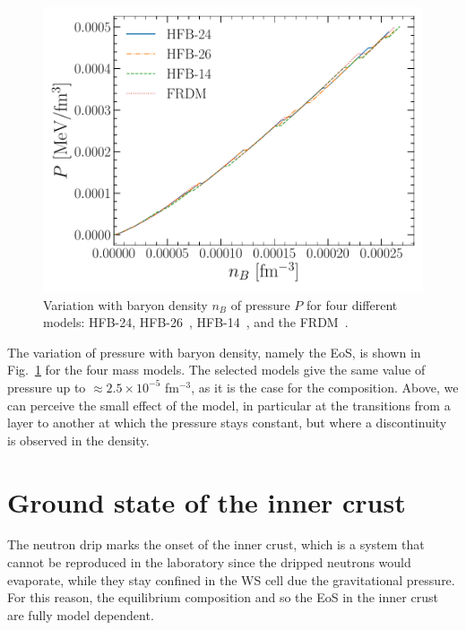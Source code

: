 \begin{figure}[!t]
\begin{center}
  \includegraphics[width=0.8\linewidth]{figures/ocrust_pres.pdf}
\end{center}
\caption[Pressure versus baryon density in the outer crust]{Variation with 
  baryon density $n_B$ of pressure $P$ for four different models: HFB-24, 
  HFB-26~\cite{Goriely2013}, HFB-14~\cite{Goriely2007}, and the 
FRDM~\cite{Moller1995}.}\label{fig:ocrust_pres}
\end{figure}

The variation of pressure with baryon density, namely the EoS, is shown in
Fig.~\ref{fig:ocrust_pres} for the four mass models. The selected models give 
the same value of pressure up to $\approx 2.5\times10^{-5}$ fm$^{-3}$, as it is 
the case for the composition. Above, we can perceive the small effect of the 
model, in particular at the transitions from a layer to another at which the 
pressure stays constant, but where a discontinuity is observed in the 
density.


\section{Ground state of the inner crust}\label{sec:icrust_gs}

The neutron drip marks the onset of the inner crust, which is a system that
cannot be reproduced in the laboratory since the dripped neutrons would
evaporate, while they stay confined in the WS cell due the gravitational
pressure. For this reason, the equilibrium composition and so the EoS in the 
inner crust are fully model dependent.

